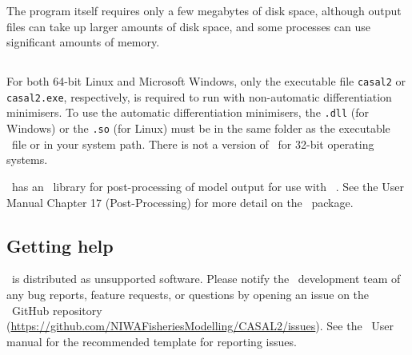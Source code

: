 The program itself requires only a few megabytes of disk space, although output files can take up larger amounts of disk space, and some processes can use significant amounts of memory.

\subsection{}

For both 64-bit Linux and Microsoft Windows, only the executable file \texttt{casal2} or \texttt{casal2.exe}, respectively, is required to run \CNAME with non-automatic differentiation minimisers. To use the automatic differentiation minimisers, the \texttt{.dll} (for Windows) or the \texttt{.so} (for Linux) must be in the same folder as the executable \CNAME\ file or in your system path. There is not a version of \CNAME\ for 32-bit operating systems. 

\CNAME\ has an \R\ library for post-processing of model output for use with \href{http://www.r-project.org}{\R}\ \citep{R}. See the \CNAME User Manual Chapter 17 (Post-Processing) for more detail on the \R\ package.

\subsection{Getting help}

\CNAME\ is distributed as unsupported software. Please notify the \CNAME\ development team of any bug reports, feature requests, or questions by opening an issue on the \CNAME\ GitHub repository (\url{https://github.com/NIWAFisheriesModelling/CASAL2/issues}). See the \CNAME\ User manual \citep{CASAL2} for the recommended template for reporting issues.

